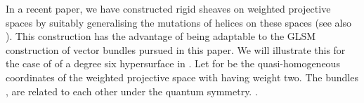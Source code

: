 \documentclass[a4paper,12pt]{article}
\def\Bbb{\mathbb}
\def\BZ{\Bbb Z} \def\BR{\Bbb R}
\begin{document}
In a recent paper\cite{helices}, we have constructed  rigid sheaves
on weighted projective spaces by suitably generalising the mutations of
helices on these spaces (see also \cite{mayrtomas}). 
This construction has the advantage of 
being adaptable to the GLSM construction of vector bundles pursued in
this paper. We will illustrate this for the case of of a degree
six hypersurface in \coordHE{}. Let \coordHE{} for \coordHE{}
be the quasi-homogeneous coordinates of the weighted projective space
with \coordHE{} having weight two.
The \coordHE{} bundles
\coordHE{}, \coordHE{} are related to each other under the quantum
\myHighlight{$\BZ_6$}\coordHE{} symmetry. \coordHE{}.
\end{document}
